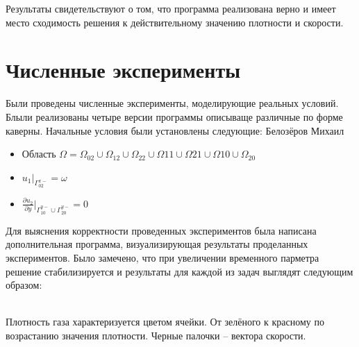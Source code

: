\documentclass[a4paper, 25pt]{article}
\begin{document}
Результаты свидетельствуют о том, что программа реализована верно и имеет место сходимость решения к действительному значению плотности и скорости.
\newpage

\section {Численные эксперименты}

Были проведены численные эксперименты, моделирующие реальных условий.
Блыли реализованы четыре версии программы описываще различные по форме каверны.
Начальные условия были установлены следующие:
Белозёров Михаил
\begin {itemize}
\item Область $\Omega = \Omega_{02} \cup \Omega_{12} \cup \Omega_{22} \cup \Omega{11} \cup \Omega{21} \cup \Omega{10} \cup \Omega_{20}$
  \item $u_1|_{\Gamma_{02}^{x-}} = \omega$
  \item $\frac{{\partial}u_2}{{\partial}y}|_{\Gamma_{10}^{y-}\cup\Gamma_{20}^{y-}} = 0$
\end   {itemize}

Для выяснения корректности проведенных экспериментов была написана дополнительная программа, визуализирующая результаты проделанных экспериментов. Было замечено, что при увеличении временного парметра решение стабилизируется и результаты для каждой из задач выглядят следующим образом: \\
\begin{figure}[h!]
\end{figure}
\\
Плотность газа характеризуется цветом ячейки. От зелёного к красному по возрастанию значения плотности. Черные палочки -- вектора скорости.
\end{document}
